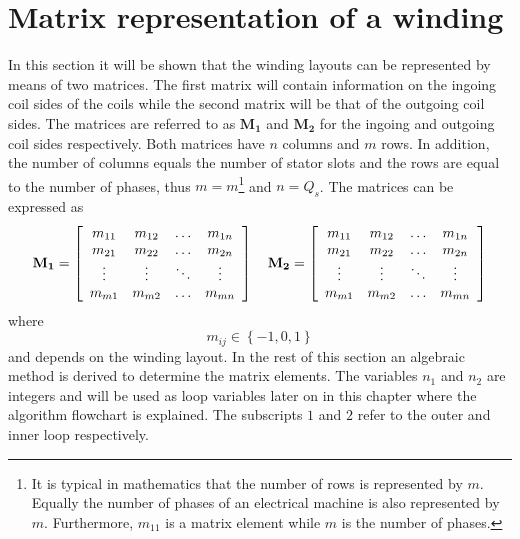 \section{Matrix representation of a winding}
In this section it will be shown that the winding layouts can be represented by means of two matrices. The first matrix will contain information on the ingoing coil sides of the coils while the second matrix will be that of the outgoing coil sides. The matrices are referred to as $\mathbf{M_1}$ and $\mathbf{M_{2}}$ for the ingoing and outgoing coil sides respectively. Both matrices have $n$ columns and $m$ rows. In addition, the number of columns equals the number of stator slots and the rows are equal to the number of phases, thus $m=m$\footnote{It is typical in mathematics that the number of rows is represented by $m$. Equally the number of phases of an electrical machine is also represented by $m$. Furthermore, $m_{11}$ is a matrix element while $m$ is the number of phases.} and $n=Q_s$. The matrices can be expressed as
\begin{equation}
  \label{eqn:M_matrix}
  \mathbf{M_1} = \left[
  \begin{array}{cccc}
     m_{11} & m_{12} & \ldots & m_{1n}\\
     m_{21} & m_{22} & \ldots & m_{2n}\\
     \vdots & \vdots & \ddots & \vdots\\
     m_{m1} & m_{m2} & \ldots & m_{mn}\\
  \end{array} \right]
  \quad
  \mathbf{M_2} = \left[
  \begin{array}{c c c c}
     m_{11} & m_{12} & \ldots & m_{1n}\\
     m_{21} & m_{22} & \ldots & m_{2n}\\
     \vdots & \vdots & \ddots & \vdots\\
     m_{m1} & m_{m2} & \ldots & m_{mn}\\
  \end{array} \right]  
\end{equation}
where
\begin{equation}
  \label{eqn:cij_set}
  m_{ij} \in \left\{-1,0,1\right\}
\end{equation}
and depends on the winding layout. In the rest of this section an algebraic method is derived to determine the matrix elements. The variables $n_1$ and $n_2$ are integers and will be used as loop variables later on in this chapter where the algorithm flowchart is explained. The subscripts $1$ and $2$ refer to the outer and inner loop respectively. 

